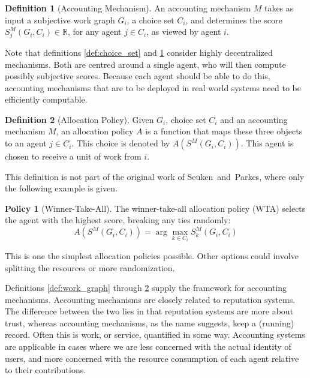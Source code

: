 \documentclass[a4paper,11pt]{book}
\newcommand{\bb}{\mathbb}
\theoremstyle{definition}
\newtheorem{definition}{Definition}
\newtheorem{policy}{Policy}
\begin{document}
\begin{definition}[Accounting Mechanism]
   An accounting mechanism $M$ takes as input a subjective work graph $G_i$, a choice set $C_i$, and
   determines the score $S_j^M(G_i, C_i) \in \bb{R}$, for any agent $j \in C_i$, as viewed by agent
   $i$.
   \label{def:acc_mech}
\end{definition}

Note that definitions \ref{def:choice_set} and \ref{def:acc_mech} consider highly decentralized mechanisms.
Both are centred around a single agent, who will then compute possibly subjective scores. Because each
agent should be able to do this, accounting mechanisms that are to be deployed in real world systems need
to be efficiently computable. 

\begin{definition}[Allocation Policy]
    Given $G_i$, choice set $C_i$ and an accounting mechanism $M$, an allocation policy $A$
    is a function that maps these three objects to an agent $j \in C_i$. This choice is denoted
    by $A(S^M(G_i, C_i))$. This agent is chosen to receive a unit of work from $i$.
    \label{def:all_pol}
\end{definition}

This definition is not part of the original work of Seuken~and~Parkes,
where only the following example is given.

\begin{policy}[Winner-Take-All]
   The winner-take-all allocation policy (WTA) selects the agent with the highest score,
   breaking any ties randomly:
   \begin{equation*}
       A(S^M(G_i, C_i)) = \arg \max_{k\in C_i} S_k^M(G_i, C_i) 
   \end{equation*}
\end{policy}

This is one the simplest allocation policies possible. Other options could involve  
splitting the resources or more randomization.

Definitions \ref{def:work_graph} through \ref{def:all_pol} supply the framework for accounting
mechanisms. Accounting mechanisms are closely related to reputation systems. The difference
between the two lies in that reputation systems are more about trust, whereas accounting mechanisms,
as the name suggests, keep a (running) record. Often this is work, or service, quantified in some way.
Accounting systems are applicable in cases where we are less concerned with the actual identity
of users, and more concerned with the resource consumption of each agent relative to their contributions.
\end{document}
